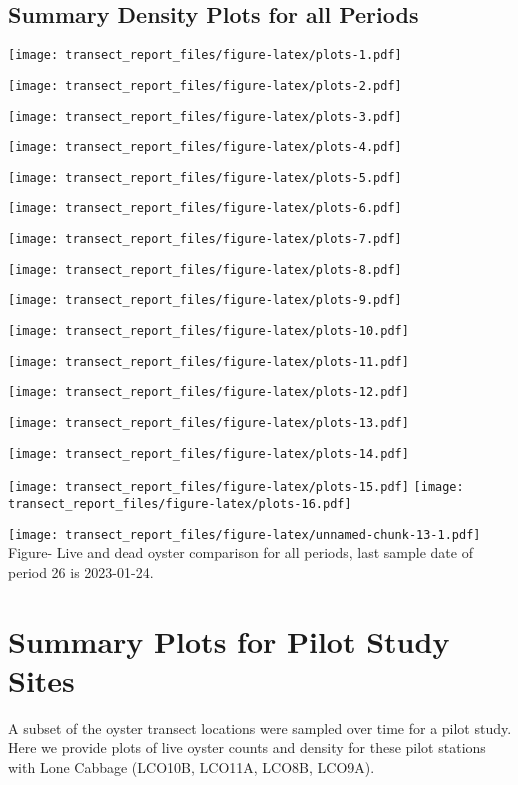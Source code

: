 \documentclass[
]{article}
\begin{document}
\hypertarget{summary-density-plots-for-all-periods}{%
\subsection{Summary Density Plots for all
Periods}\label{summary-density-plots-for-all-periods}}

\texttt{[image: transect\_report\_files/figure-latex/plots-1.pdf]}

\texttt{[image: transect\_report\_files/figure-latex/plots-2.pdf]}

\texttt{[image: transect\_report\_files/figure-latex/plots-3.pdf]}

\texttt{[image: transect\_report\_files/figure-latex/plots-4.pdf]}

\texttt{[image: transect\_report\_files/figure-latex/plots-5.pdf]}

\texttt{[image: transect\_report\_files/figure-latex/plots-6.pdf]}

\texttt{[image: transect\_report\_files/figure-latex/plots-7.pdf]}

\texttt{[image: transect\_report\_files/figure-latex/plots-8.pdf]}

\texttt{[image: transect\_report\_files/figure-latex/plots-9.pdf]}

\texttt{[image: transect\_report\_files/figure-latex/plots-10.pdf]}

\texttt{[image: transect\_report\_files/figure-latex/plots-11.pdf]}

\texttt{[image: transect\_report\_files/figure-latex/plots-12.pdf]}

\texttt{[image: transect\_report\_files/figure-latex/plots-13.pdf]}

\texttt{[image: transect\_report\_files/figure-latex/plots-14.pdf]}

\texttt{[image: transect\_report\_files/figure-latex/plots-15.pdf]}
\texttt{[image: transect\_report\_files/figure-latex/plots-16.pdf]}
\newpage

\texttt{[image: transect\_report\_files/figure-latex/unnamed-chunk-13-1.pdf]}
Figure- Live and dead oyster comparison for all periods, last sample
date of period 26 is 2023-01-24. \newpage

\hypertarget{summary-plots-for-pilot-study-sites}{%
\section{Summary Plots for Pilot Study
Sites}\label{summary-plots-for-pilot-study-sites}}

A subset of the oyster transect locations were sampled over time for a
pilot study. Here we provide plots of live oyster counts and density for
these pilot stations with Lone Cabbage (LCO10B, LCO11A, LCO8B, LCO9A).
\end{document}

